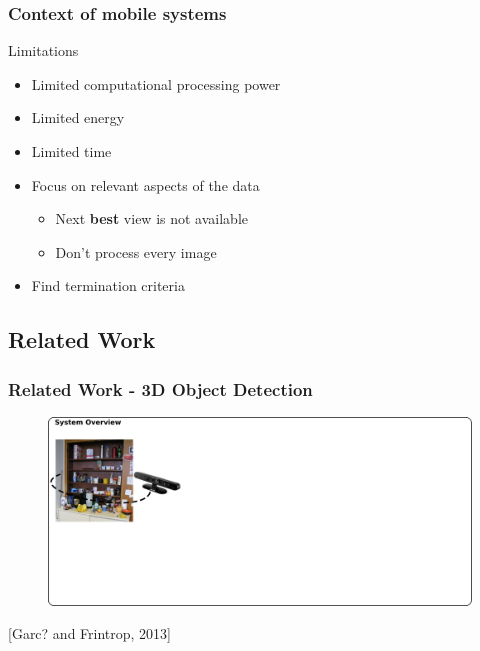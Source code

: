 \documentclass[t]{beamer} %
\begin{document}
\begin{frame}
	\frametitle{ Context of mobile systems }
	\begin{block}{Limitations}    
		\begin{itemize}
			\item Limited computational processing power
			\item Limited energy
			\item Limited time
		\end{itemize}
	\end{block}
	\begin{itemize}
		\item Focus on relevant aspects of the data
		\begin{itemize}
			\item Next \textbf{best} view is not available
			\item Don't process every image
		\end{itemize}		
		\item Find termination criteria
	\end{itemize}
\end{frame}

\subsection{Related Work}
\begin{frame}
	\frametitle{ Related Work - 3D Object Detection }
	\begin{figure}[h]
		\includegraphics[width=1\textwidth]{src/frintrop0.png}
	\end{figure}
	\centering
	\scriptsize [Garc? and Frintrop, 2013]
\end{frame}
\end{document}
